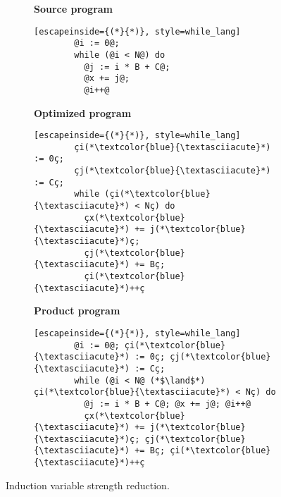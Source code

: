 \begin{figure}
  \centering
  \begin{subfigure}[b]{0.45\textwidth}
    \begin{minipage}[t]{\linewidth}
      \textbf{Source program}
      \begin{lstlisting}[escapeinside={(*}{*)}, style=while_lang]
        @i := 0@; 
        while (@i < N@) do
          @j := i * B + C@;
          @x += j@;
          @i++@
      \end{lstlisting}
    \end{minipage}
  \end{subfigure}
  \hfill
  \begin{subfigure}[b]{0.45\textwidth}
    \begin{minipage}[t]{\linewidth}
      \textbf{Optimized program}
      \begin{lstlisting}[escapeinside={(*}{*)}, style=while_lang]
        çi(*\textcolor{blue}{\textasciiacute}*) := 0ç;
        çj(*\textcolor{blue}{\textasciiacute}*) := Cç;
        while (çi(*\textcolor{blue}{\textasciiacute}*) < Nç) do
          çx(*\textcolor{blue}{\textasciiacute}*) += j(*\textcolor{blue}{\textasciiacute}*)ç;
          çj(*\textcolor{blue}{\textasciiacute}*) += Bç;
          çi(*\textcolor{blue}{\textasciiacute}*)++ç
      \end{lstlisting}
    \end{minipage}
  \end{subfigure}
  \hfill
  \begin{subfigure}[b]{0.9\textwidth}
    \begin{minipage}[t]{\linewidth}
      \textbf{Product program}
      \begin{lstlisting}[escapeinside={(*}{*)}, style=while_lang]
        @i := 0@; çi(*\textcolor{blue}{\textasciiacute}*) := 0ç; çj(*\textcolor{blue}{\textasciiacute}*) := Cç;
        while (@i < N@ (*$\land$*) çi(*\textcolor{blue}{\textasciiacute}*) < Nç) do
          @j := i * B + C@; @x += j@; @i++@
          çx(*\textcolor{blue}{\textasciiacute}*) += j(*\textcolor{blue}{\textasciiacute}*)ç; çj(*\textcolor{blue}{\textasciiacute}*) += Bç; çi(*\textcolor{blue}{\textasciiacute}*)++ç
      \end{lstlisting}
    \end{minipage}
  \end{subfigure}
  \caption{Induction variable strength reduction.}
  \label{fig:induction_var_strength_red}
\end{figure}

